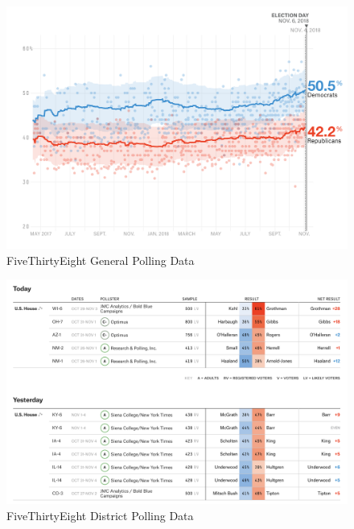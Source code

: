 \documentclass[12pt, letterpaper]{article}
\begin{document}
 \begin{figure}[tbh]
  \centering
  \includegraphics[scale=0.45]{general_polling}
  \caption{FiveThirtyEight General Polling Data}
  \label{fig:genpolls}
\end{figure}

 \begin{figure}[tbh]
  \centering
  \includegraphics[scale=0.4]{district_polls}
  \caption{FiveThirtyEight District Polling Data}
  \label{fig:distpolls}
\end{figure}
\end{document}
